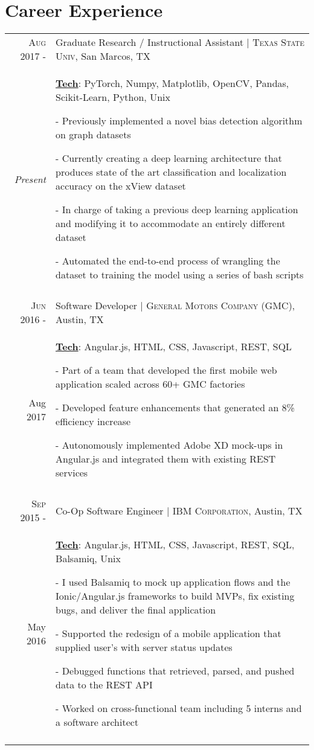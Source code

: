 \documentclass[a4paper,10pt]{article}
\begin{document}
\section{Career Experience}
\begin{tabular}{r|p{12cm}}
\textsc{Aug 2017 -} & Graduate Research / Instructional Assistant | \textsc{Texas State Univ}, San Marcos, TX \\
\emph{Present} & \small{
	\textbf{\underline{Tech}}: PyTorch, Numpy, Matplotlib, OpenCV, Pandas, Scikit-Learn, Python, Unix
	}

	\tiny{
	\vphantom{a}
	}

	\small{
	- Previously implemented a novel bias detection algorithm on graph datasets	
	
	- Currently creating a deep learning architecture that produces state of the art classification and localization accuracy on the xView dataset
	
	- In charge of taking a previous deep learning application and modifying it to accommodate an entirely different dataset 
	
	- Automated the end-to-end process of wrangling the dataset to training the model using a series of bash scripts
	}
	\\
 \multicolumn{2}{c}{} \\
 
 \textsc{Jun 2016 -} & Software Developer | \textsc{General Motors Company (GMC)}, Austin, TX \\
Aug 2017 & \small{
	\textbf{\underline{Tech}}: Angular.js, HTML, CSS, Javascript, REST, SQL}

	\tiny{
	\vphantom{a}
	}
	
	\small{
	- Part of a team that developed the first mobile web application scaled across 60+ GMC factories 
	
	- Developed feature enhancements that generated an 8\% efficiency increase
	
	- Autonomously implemented Adobe XD mock-ups in Angular.js and integrated them with existing REST services
} \\
 \multicolumn{2}{c}{} \\
 
 \textsc{Sep 2015 -} & Co-Op Software Engineer | \textsc{IBM Corporation}, Austin, TX \\
 May 2016 & \small{
 	\textbf{\underline{Tech}}: Angular.js, HTML, CSS, Javascript, REST, SQL, Balsamiq, Unix}
 
	\tiny{
	\vphantom{a}
	}
	
	\small{
 	- I used Balsamiq to mock up application flows and the Ionic/Angular.js frameworks to build MVPs, fix existing bugs, and deliver the final application
 	
 	- Supported the redesign of a mobile application that supplied user’s with server status updates
 	
 	- Debugged functions that retrieved, parsed, and pushed data to the REST API 
 	
 	- Worked on cross-functional team including 5 interns and a software architect
 } \\
 \multicolumn{2}{c}{} \\
\end{tabular}
\end{document}
